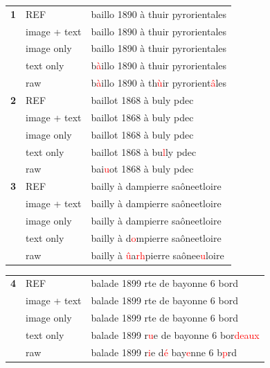 \begin{table}[htbp]
\centering
\small
\renewcommand{\arraystretch}{1.15}
\setlength{\tabcolsep}{4pt}

\begin{minipage}[t]{0.48\linewidth}
\centering
\begin{tabularx}{\linewidth}{>{\bfseries}ll X}
\hline
1&REF & baillo 1890 à thuir pyrorientales \\
&image + text & baillo 1890 à thuir pyrorientales \\
&image only & baillo 1890 à thuir pyrorientales \\
&text only & b\textcolor{red}{à}illo 1890 à thuir pyrorientales \\
&raw & b\textcolor{red}{à}illo 1890 à th\textcolor{red}{ù}ir pyrorient\textcolor{red}{â}les \\
\hline
2&REF & baillot 1868 à buly pdec \\
&image + text & baillot 1868 à buly pdec \\
&image only & baillot 1868 à buly pdec \\
&text only & baillot 1868 à bu\textcolor{red}{l}ly pdec \\
&raw & bai\textcolor{red}{u}ot 1868 à buly pdec \\
\hline
3&REF & bailly à dampierre saôneetloire \\
&image + text & bailly à dampierre saôneetloire \\
&image only & bailly à dampierre saôneetloire \\
&text only & bailly à d\textcolor{red}{o}mpierre saôneetloire \\
&raw & bailly à \textcolor{red}{û}a\textcolor{red}{rh}pierre saônee\textcolor{red}{u}loire \\
\hline
\end{tabularx}
\end{minipage}
\hfill
\begin{minipage}[t]{0.48\linewidth}
\centering
\begin{tabularx}{\linewidth}{>{\bfseries}ll X}
\hline
4&REF & balade 1899 rte de bayonne 6 bord \\
&image + text & balade 1899 rte de bayonne 6 bord \\
&image only & balade 1899 rte de bayonne 6 bord \\
&text only & balade 1899 r\textcolor{red}{u}e de bayonne 6 bor\textcolor{red}{deaux} \\
&raw & balade 1899 r\textcolor{red}{i}e d\textcolor{red}{é} bay\textcolor{red}{e}nne 6 b\textcolor{red}{p}rd \\

\end{tabularx}
\end{minipage}
\end{table}
